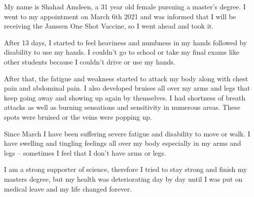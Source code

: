My name is Shahad Amdeen, a 31 year old female pursuing a master’s degree. I
went to my appointment on March 6th 2021 and was informed that I will be
receiving the Janssen One Shot Vaccine, so I went ahead and took it.

After 13 days, I started to feel heaviness and numbness in my hands followed by
disability to use my hands. I couldn’t go to school or take my final exams like
other students because I couldn’t drive or use my hands.

After that, the fatigue and weakness started to attack my body along with chest
pain and abdominal pain. I also developed bruises all over my arms and legs that
keep going away and showing up again by themselves. I had shortness of breath
attacks as well as burning sensations and sensitivity in numerous areas. These
spots were bruised or the veins were popping up.

Since March I have been suffering severe fatigue and disability to move or
walk. I have swelling and tingling feelings all over my body especially in my
arms and legs – sometimes I feel that I don’t have arms or legs.

I am a strong supporter of science, therefore I tried to stay strong and finish
my masters degree, but my health was deteriorating day by day until I was put on
medical leave and my life changed forever.

